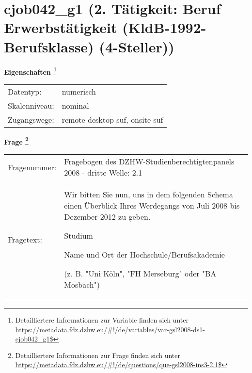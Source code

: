 
    \setcounter{footnote}{0}

    \vspace*{-1.8cm}
	\section{cjob042\_g1 (2. Tätigkeit: Beruf Erwerbstätigkeit (KldB-1992-Berufsklasse) (4-Steller))}
	\label{section:cjob042_g1}



    \vspace*{0.5cm}
    \noindent\textbf{Eigenschaften
	\footnote{Detailliertere Informationen zur Variable finden sich unter
		\url{https://metadata.fdz.dzhw.eu/\#!/de/variables/var-gsl2008-ds1-cjob042_g1$}}}\\
	\begin{tabularx}{\hsize}{@{}lX}
	Datentyp: & numerisch \\
	Skalenniveau: & nominal \\
	Zugangswege: &
	  remote-desktop-suf, 
	  onsite-suf
 \\
    \end{tabularx}



				\vspace*{0.5cm}
                \noindent\textbf{Frage
	                \footnote{Detailliertere Informationen zur Frage finden sich unter
		              \url{https://metadata.fdz.dzhw.eu/\#!/de/questions/que-gsl2008-ins3-2.1$}}}\\
				\begin{tabularx}{\hsize}{@{}lX}
					Fragenummer: &
					  Fragebogen des DZHW-Studienberechtigtenpanels 2008 - dritte Welle:
					  2.1
 \\
					Fragetext: & Wir bitten Sie nun, uns in dem folgenden Schema einen Überblick Ihres Werdegangs von Juli 2008 bis Dezember 2012 zu geben.\par  Studium\par  Name und Ort der Hochschule/Berufsakademie\par  (z. B. "Uni Köln", "FH Merseburg" oder "BA Mosbach") \\
				\end{tabularx}






